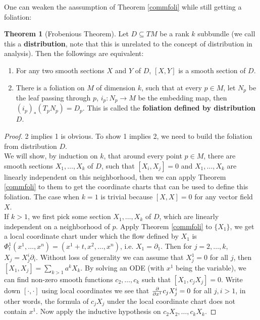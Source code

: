 \documentclass{article}
\theoremstyle{definition}
\newtheorem{thm}{Theorem}[section]
\begin{document}
One can weaken the aassumption of Theorem \ref{commfoli} while still getting a foliation:

\begin{thm}[Frobenious Theorem]
    Let $D\subseteq TM$ be a rank $k$ subbundle (we call this a {\bf distribution}, note that this is unrelated to the concept of distribution in analysis). Then the followings are equivalent:
    \begin{enumerate}
        \item For any two smooth sections $X$ and $Y$ of $D$, $[X, Y]$ is a smooth section of $D$.
        \item There is a foliation on $M$ of dimension $k$, such that at every $p\in M$, let $N_p$ be the leaf passing through $p$, $i_p: N_p\rightarrow M$ be the embedding map, then $(i_p)_*(T_pN_p)=D_p$. This is called the {\bf foliation defined by distribution $D$}.
    \end{enumerate}
\end{thm}

\begin{proof}
    2 implies 1 is obvious. To show 1 implies 2, we need to build the foliation from distribution $D$. \\

    We will show, by induction on $k$, that around every point $p\in M$, there are smooth sections $X_1, \dots, X_k$ of $D$, such that $[X_i, X_j]=0$ and $X_1, \dots, X_k$ are linearly independent on this neighborhood, then we can apply Theorem \ref{commfoli} to them to get the coordinate charts that can be used to define this foliation. The case when $k=1$ is trivial because $[X, X]=0$ for any vector field $X$.\\

    If $k>1$, we first pick some section $X_1, \dots, X_k$ of $D$, which are linearly independent on a neighborhood of $p$. Apply Theorem \ref{commfoli} to $\{X_1\}$, we get a local coordinate chart under which the flow defined by $X_1$ is $\Phi^1_t(x^1, \dots, x^n)=(x^1+t, x^2, \dots, x^n)$, i.e. $X_1=\partial_1$. Then for $j=2, \dots, k$, $X_j=X^i_j\partial_i$. Without loss of generality we can assume that $X^1_j=0$ for all $j$, then $[X_1, X_j]=\sum_{k>1}a^kX_k$. By solving an ODE (with $x^1$ being the variable), we can find non-zero smooth functions $c_2, \dots, c_k$ such that $[X_1, c_jX_j]=0$. Write down $[\cdot, \cdot]$ using local coordinates we see that ${\partial\over \partial x^1}c_jX^i_j=0$ for all $j, i>1$, in other words, the formula of $c_jX_j$ under the local coordinate chart does not contain $x^1$. Now apply the inductive hypothesis on $c_2X_2, \dots, c_kX_k$.
\end{proof}
\end{document}
